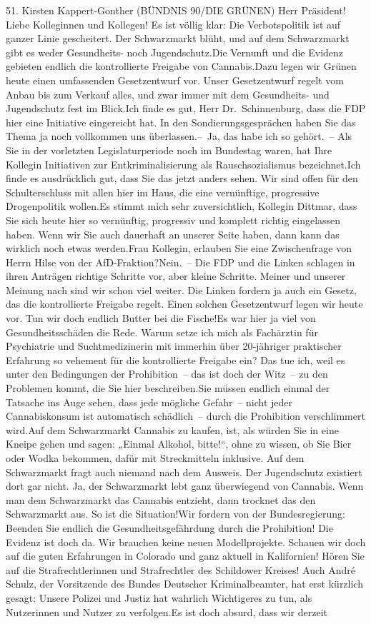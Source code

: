 \documentclass{article}
\begin{document}
	51. Kirsten Kappert-Gonther (BÜNDNIS 90/DIE GRÜNEN) Herr Präsident! Liebe Kolleginnen und Kollegen! Es ist völlig klar: Die Verbotspolitik ist auf ganzer Linie gescheitert. Der Schwarzmarkt blüht, und auf dem Schwarzmarkt gibt es weder Gesundheits- noch Jugendschutz.Die Vernunft und die Evidenz gebieten endlich die kontrol­lierte Freigabe von Cannabis.Dazu legen wir Grünen heute einen umfassenden Gesetzentwurf vor. Unser Gesetzentwurf regelt vom Anbau bis zum Verkauf alles, und zwar immer mit dem Gesundheits- und Jugendschutz fest im Blick.Ich finde es gut, Herr Dr. Schinnenburg, dass die FDP hier eine Initiative eingereicht hat. In den Sondierungsgesprächen haben Sie das Thema ja noch vollkommen uns überlassen.– Ja, das habe ich so gehört. – Als Sie in der vorletzten Legislaturperiode noch im Bundestag waren, hat Ihre Kollegin Initiativen zur Entkriminalisierung als Rauschsozialismus bezeichnet.Ich finde es ausdrücklich gut, dass Sie das jetzt anders sehen. Wir sind offen für den Schulterschluss mit allen hier im Haus, die eine vernünftige, progressive Drogenpolitik wollen.Es stimmt mich sehr zuversichtlich, Kollegin Dittmar, dass Sie sich heute hier so vernünftig, progressiv und komplett richtig eingelassen haben. Wenn wir Sie auch dauerhaft an unserer Seite haben, dann kann das wirklich noch etwas werden.Frau Kollegin, erlauben Sie eine Zwischenfrage von Herrn Hilse von der AfD-Fraktion?Nein. – Die FDP und die Linken schlagen in ihren Anträgen richtige Schritte vor, aber kleine Schritte. Meiner und unserer Meinung nach sind wir schon viel weiter. Die Linken fordern ja auch ein Gesetz, das die kontrollierte Freigabe regelt. Einen solchen Gesetzentwurf legen wir heute vor. Tun wir doch endlich Butter bei die Fische!Es war hier ja viel von Gesundheitsschäden die Rede. Warum setze ich mich als Fachärztin für Psychiatrie und Suchtmedizinerin mit immerhin über 20‑jähriger praktischer Erfahrung so vehement für die kontrollierte Freigabe ein? Das tue ich, weil es unter den Bedingungen der Prohibition – das ist doch der Witz – zu den Problemen kommt, die Sie hier beschreiben.Sie müssen endlich einmal der Tatsache ins Auge sehen, dass jede mögliche Gefahr – nicht jeder Cannabiskonsum ist automatisch schädlich – durch die Prohibition verschlimmert wird.Auf dem Schwarzmarkt Cannabis zu kaufen, ist, als würden Sie in eine Kneipe gehen und sagen: „Einmal Alkohol, bitte!“, ohne zu wissen, ob Sie Bier oder ­Wodka bekommen, dafür mit Streckmitteln inklusive. Auf dem Schwarzmarkt fragt auch niemand nach dem Ausweis. Der Jugendschutz existiert dort gar nicht. Ja, der Schwarzmarkt lebt ganz überwiegend von Cannabis. Wenn man dem Schwarzmarkt das Cannabis entzieht, dann trocknet das den Schwarzmarkt aus. So ist die Situation!Wir fordern von der Bundesregierung: Beenden Sie endlich die Gesundheitsgefährdung durch die Prohibition! Die Evidenz ist doch da. Wir brauchen keine neuen Modellprojekte. Schauen wir doch auf die guten Erfahrungen in Colorado und ganz aktuell in Kalifornien! Hören Sie auf die Strafrechtlerinnen und Strafrechtler des Schildower Kreises! Auch André Schulz, der Vorsitzende des Bundes Deutscher Kriminalbeamter, hat erst kürzlich gesagt: Unsere Polizei und Justiz hat wahrlich Wichtigeres zu tun, als Nutzerinnen und Nutzer zu verfolgen.Es ist doch absurd, dass wir derzeit 
\end{document}
